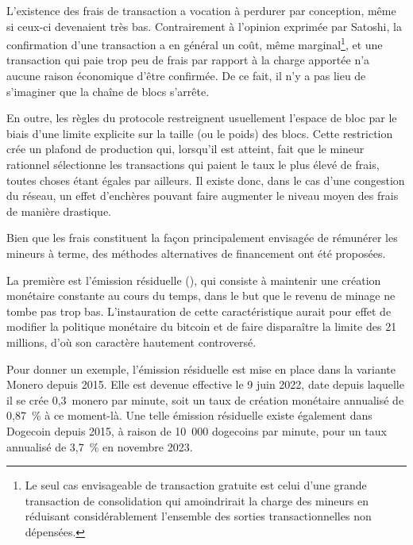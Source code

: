 L'existence des frais de transaction a vocation à perdurer par conception, même si ceux-ci devenaient très bas. Contrairement à l'opinion exprimée par Satoshi, la confirmation d'une transaction a en général un coût, même marginal\footnote{Le seul cas envisageable de transaction gratuite est celui d'une grande transaction de consolidation qui amoindrirait la charge des mineurs en réduisant considérablement l'ensemble des sorties transactionnelles non dépensées.}, et une transaction qui paie trop peu de frais par rapport à la charge apportée n'a aucune raison économique d'être confirmée. De ce fait, il n'y a pas lieu de s'imaginer que la chaîne de blocs s'arrête.

En outre, les règles du protocole restreignent usuellement l'espace de bloc par le biais d'une limite explicite sur la taille (ou le poids) des blocs. Cette restriction crée un plafond de production qui, lorsqu'il est atteint, fait que le mineur rationnel sélectionne les transactions qui paient le taux le plus élevé de frais, toutes choses étant égales par ailleurs. Il existe donc, dans le cas d'une congestion du réseau, un effet d'enchères pouvant faire augmenter le niveau moyen des frais de manière drastique.


Bien que les frais constituent la façon principalement envisagée de rémunérer les mineurs à terme, des méthodes alternatives de financement ont été proposées.

La première est l'émission résiduelle (), qui consiste à maintenir une création monétaire constante au cours du temps, dans le but que le revenu de minage ne tombe pas trop bas. L'instauration de cette caractéristique aurait pour effet de modifier la politique monétaire du bitcoin et de faire disparaître la limite des 21 millions, d'où son caractère hautement controversé.

Pour donner un exemple, l'émission résiduelle est mise en place dans la variante Monero depuis 2015. Elle est devenue effective le 9 juin 2022, date depuis laquelle il se crée 0,3~monero par minute, soit un taux de création monétaire annualisé de 0,87~\% à ce moment-là. Une telle émission résiduelle existe également dans Dogecoin depuis 2015, à raison de 10~000 dogecoins par minute, pour un taux annualisé de 3,7~\% en novembre 2023.

